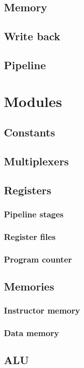 \documentclass[11pt, a4paper, twoside]{IEEEtran}
\begin{document}
\subsection{Memory}
\subsection{Write back}
\subsection{Pipeline}
	
\section{Modules}
	\subsection{Constants}
	\subsection{Multiplexers}
	\subsection{Registers}
		\subsubsection{Pipeline stages}
		\subsubsection{Register files}
		\subsubsection{Program counter}
	\subsection{Memories}
		\subsubsection{Instructor memory}
		\subsubsection{Data memory}
	\subsection{ALU}
\end{document}
